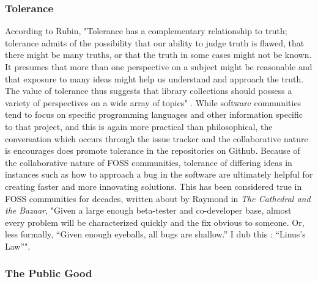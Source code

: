 \subsubsection{Tolerance}

According to Rubin, "Tolerance has a complementary relationship to truth; tolerance admits of the possibility that our ability to judge truth is flawed, that there might be many truths, or that the truth in some cases might not be known. It presumes that more than one perspective on a subject might be reasonable and that exposure to many ideas might help us understand and approach the truth. The value of tolerance thus suggests that library collections should possess a variety of perspectives on a wide array of topics"
\cite{rubin2016foundationslis}. While software communities tend to focus on specific programming languages and other information specific to that project, and this is again more practical than philosophical, the conversation which occurs through the issue tracker and the collaborative nature is encourages does promote tolerance in the repositories on Github. Because of the collaborative nature of FOSS communities, tolerance of differing ideas in instances such as how to approach a bug in the software are ultimately helpful for creating faster and more innovating solutions. This has been considered true in FOSS communities for decades, written about by Raymond in \textit{The Cathedral and the Bazaar}, "Given a large enough beta-tester and co-developer base, almost every problem will be characterized quickly and the fix obvious to someone. Or, less formally, “Given enough eyeballs, all bugs are shallow.” I
dub this : “Linus’s Law”"\cite{raymond2001cathedral}.

\subsubsection{The Public Good}

